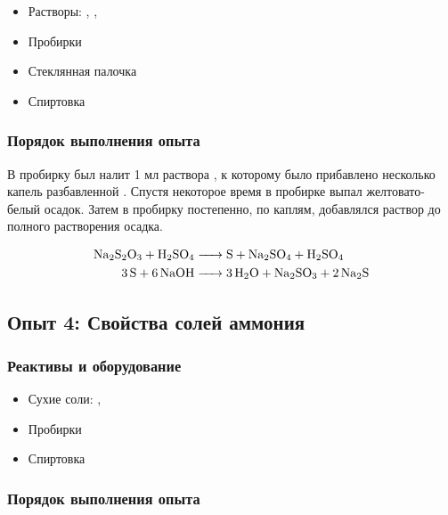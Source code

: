 \documentclass[a4paper, 12pt]{article}
\begin{document}
\begin{itemize}
	\item Растворы: , , 
	
	\item Пробирки
	
	\item Стеклянная палочка
	
	\item Спиртовка
\end{itemize}

\subsubsection{Порядок выполнения опыта}

В пробирку был налит 1 мл раствора , к которому было прибавлено несколько капель разбавленной . Спустя некоторое время в пробирке выпал желтовато-белый осадок. Затем в пробирку постепенно, по каплям, добавлялся раствор  до полного растворения осадка. %

\begin{align}
	\ce{Na2S2O3 + H2SO4 &-> S + Na2SO4 + H2SO4}\\
	\ce{3S + 6NaOH &-> 3 H2O + Na2SO3 + 2 Na2S}
\end{align}

\subsection{Опыт 4: Свойства солей аммония}

\subsubsection{Реактивы и оборудование}

\begin{itemize}
	\item Сухие соли: , 
	
	\item Пробирки
	
	\item Спиртовка
\end{itemize}

\subsubsection{Порядок выполнения опыта}
\end{document}
